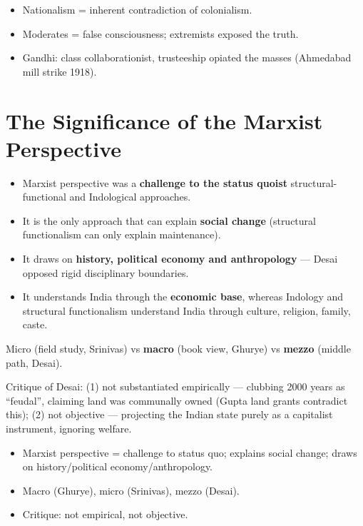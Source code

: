 \begin{QuickRevision}
\begin{itemize}
\item Nationalism = inherent contradiction of colonialism.
\item Moderates = false consciousness; extremists exposed the truth.
\item Gandhi: class collaborationist, trusteeship opiated the masses (Ahmedabad mill strike 1918).
\end{itemize}
\end{QuickRevision}

\section{The Significance of the Marxist Perspective}

\begin{itemize}
\item Marxist perspective was a \textbf{challenge to the status quoist} structural-functional and Indological approaches.
\item It is the only approach that can explain \textbf{social change} (structural functionalism can only explain maintenance).
\item It draws on \textbf{history, political economy and anthropology} --- Desai opposed rigid disciplinary boundaries.
\item It understands India through the \textbf{economic base}, whereas Indology and structural functionalism understand India through culture, religion, family, caste.
\end{itemize}

\begin{KeyConcept}
Micro (field study, Srinivas) vs \textbf{macro} (book view, Ghurye) vs \textbf{mezzo} (middle path, Desai).
\end{KeyConcept}

\begin{CriticalPoint}
Critique of Desai: (1) not substantiated empirically --- clubbing 2000 years as ``feudal'', claiming land was communally owned (Gupta land grants contradict this); (2) not objective --- projecting the Indian state purely as a capitalist instrument, ignoring welfare.
\end{CriticalPoint}

\begin{QuickRevision}
\begin{itemize}
\item Marxist perspective = challenge to status quo; explains social change; draws on history/political economy/anthropology.
\item Macro (Ghurye), micro (Srinivas), mezzo (Desai).
\item Critique: not empirical, not objective.
\end{itemize}
\end{QuickRevision}
